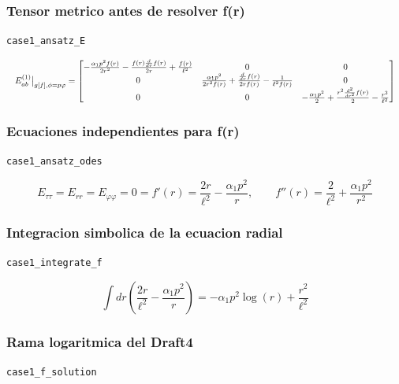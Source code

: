 \documentclass[11pt,a4paper]{article}
\begin{document}
\subsubsection{Tensor metrico antes de resolver f(r)}

\noindent\texttt{case1\_ansatz\_E}\par\nopagebreak[4]

\[
\resizebox{\textwidth}{!}{$\displaystyle E^{(1)}_{ab}\big|_{g[f],\phi=p\varphi} = \left[\begin{matrix}- \frac{\alpha_{1} p^{2} f{\left(r \right)}}{2 r^{2}} - \frac{f{\left(r \right)} \frac{d}{d r} f{\left(r \right)}}{2 r} + \frac{f{\left(r \right)}}{\ell^{2}} & 0 & 0\\0 & \frac{\alpha_{1} p^{2}}{2 r^{2} f{\left(r \right)}} + \frac{\frac{d}{d r} f{\left(r \right)}}{2 r f{\left(r \right)}} - \frac{1}{\ell^{2} f{\left(r \right)}} & 0\\0 & 0 & - \frac{\alpha_{1} p^{2}}{2} + \frac{r^{2} \frac{d^{2}}{d r^{2}} f{\left(r \right)}}{2} - \frac{r^{2}}{\ell^{2}}\end{matrix}\right]$}
\]

\subsubsection{Ecuaciones independientes para f(r)}

\noindent\texttt{case1\_ansatz\_odes}\par\nopagebreak[4]

\[
E_{\tau\tau}=E_{rr}=E_{\varphi\varphi}=0 = f'(r)=\frac{2r}{\ell^2}-\frac{\alpha_1p^2}{r},\qquad f''(r)=\frac{2}{\ell^2}+\frac{\alpha_1p^2}{r^2}
\]

\subsubsection{Integracion simbolica de la ecuacion radial}

\noindent\texttt{case1\_integrate\_f}\par\nopagebreak[4]

\[
\int dr\left(\frac{2r}{\ell^2}-\frac{\alpha_1p^2}{r}\right) = - \alpha_{1} p^{2} \log{\left(r \right)} + \frac{r^{2}}{\ell^{2}}
\]

\subsubsection{Rama logaritmica del Draft4}

\noindent\texttt{case1\_f\_solution}\par\nopagebreak[4]
\end{document}

